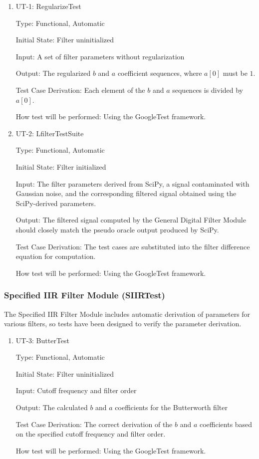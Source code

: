 \documentclass[12pt, titlepage]{article}
\begin{document}
\begin{enumerate}

\item{UT-1: RegularizeTest\\}

Type: Functional, Automatic
					
Initial State: Filter uninitialized
					
Input: A set of filter parameters without regularization
					
Output: The regularized $b$ and $a$ coefficient sequences, where $a[0]$ must be
$1$.

Test Case Derivation: Each element of the $b$ and $a$ sequences is divided by
$a[0]$.

How test will be performed: Using the GoogleTest framework.

\item{UT-2: LfilterTestSuite\\}

Type: Functional, Automatic
					
Initial State: Filter initialized
					
Input: The filter parameters derived from SciPy, a signal contaminated with
Gaussian noise, and the corresponding filtered signal obtained using the
SciPy-derived parameters.
					
Output: The filtered signal computed by the General Digital Filter Module should
closely match the pseudo oracle output produced by SciPy.

Test Case Derivation: The test cases are substituted into the filter difference
equation for computation.

How test will be performed: Using the GoogleTest framework.
    
\end{enumerate}

\subsubsection{Specified IIR Filter Module (SIIRTest)}

The Specified IIR Filter Module includes automatic derivation of parameters for
various filters, so tests have been designed to verify the parameter derivation.

\begin{enumerate}

\item{UT-3: ButterTest\\}

Type: Functional, Automatic
					
Initial State: Filter uninitialized
					
Input: Cutoff frequency and filter order
					
Output: The calculated $b$ and $a$ coefficients for the Butterworth filter

Test Case Derivation: The correct derivation of the $b$ and $a$ coefficients
based on the specified cutoff frequency and filter order.

How test will be performed: Using the GoogleTest framework.
    
\end{enumerate}
\end{document}
